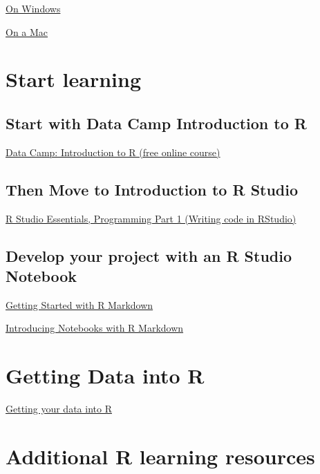\documentclass[]{book}
\theoremstyle{definition}
\theoremstyle{definition}
\theoremstyle{definition}
\theoremstyle{remark}
\begin{document}
\href{https://medium.com/@sorenlind/create-pdf-reports-using-r-r-markdown-latex-and-knitr-on-windows-10-952b0c48bfa9}{On
Windows}

\href{https://medium.com/@sorenlind/create-pdf-reports-using-r-r-markdown-latex-and-knitr-on-macos-high-sierra-e7b5705c9fd}{On
a Mac}

\section{Start learning}\label{start-learning}

\subsection{Start with Data Camp Introduction to
R}\label{start-with-data-camp-introduction-to-r}

\href{https://www.datacamp.com/courses/free-introduction-to-r}{Data
Camp: Introduction to R (free online course)}

\subsection{Then Move to Introduction to R
Studio}\label{then-move-to-introduction-to-r-studio}

\href{https://www.rstudio.com/resources/webinars/rstudio-essentials-webinar-series-part-1/}{R
Studio Essentials, Programming Part 1 (Writing code in RStudio)}

\subsection{Develop your project with an R Studio
Notebook}\label{develop-your-project-with-an-r-studio-notebook}

\href{https://www.rstudio.com/resources/webinars/getting-started-with-r-markdown/}{Getting
Started with R Markdown}

\href{https://www.rstudio.com/resources/webinars/introducing-notebooks-with-r-markdown/}{Introducing
Notebooks with R Markdown}

\section{Getting Data into R}\label{getting-data-into-r}

\href{https://www.rstudio.com/resources/webinars/getting-your-data-into-r/}{Getting
your data into R}

\section{Additional R learning
resources}\label{additional-r-learning-resources}
\end{document}
